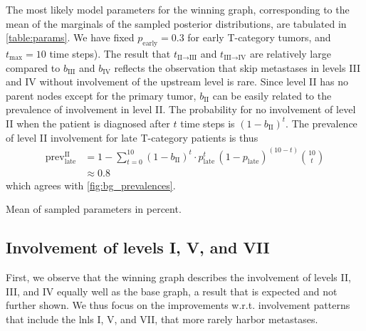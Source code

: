 \documentclass[twocolumn]{aastex631}
\begin{document}
The most likely model parameters for the winning graph, corresponding to the mean of the marginals of the sampled posterior distributions, are tabulated in \cref{table:params}. We have fixed $p_\text{early}=0.3$ for early T-category tumors, and $t_\text{max}=10$ time steps). The result that $t_{\text{II} \rightarrow \text{III}}$ and $t_{\text{III} \rightarrow \text{IV}}$ are relatively large compared to $b_\text{III}$ and $b_\text{IV}$ reflects the observation that skip metastases in levels III and IV without involvement of the upstream level is rare. Since level II has no parent nodes except for the primary tumor, $b_\text{II}$ can be easily related to the prevalence of involvement in level II. The probability for no involvement of level II when the patient is diagnosed after $t$ time steps is $\left(1-b_\text{II}\right)^t$. The prevalence of level II involvement for late T-category patients is thus
%
\begin{equation}
    \begin{aligned}
        \text{prev}_\text{late}^\text{II} &= 1-\sum_{t=0}^{10} \left(1-b_\text{II}\right)^t \cdot p_\text{late}^t \, (1-p_\text{late})^{(10-t)}\binom{10}{t} \\
        &\approx 0.8
    \end{aligned}
\end{equation}
%
which agrees with \cref{fig:bg_prevalences}.

\begin{table}[]
    \centering
    \caption{Mean of sampled parameters in percent.}
    \label{table:params}
\end{table}

\subsection{Involvement of levels I, V, and VII}

First, we observe that the winning graph describes the involvement of levels II, III, and IV equally well as the base graph, a result that is expected and not further shown. We thus focus on the improvements w.r.t. involvement patterns that include the \glspl{lnl} I, V, and VII, that more rarely harbor metastases.
\end{document}
